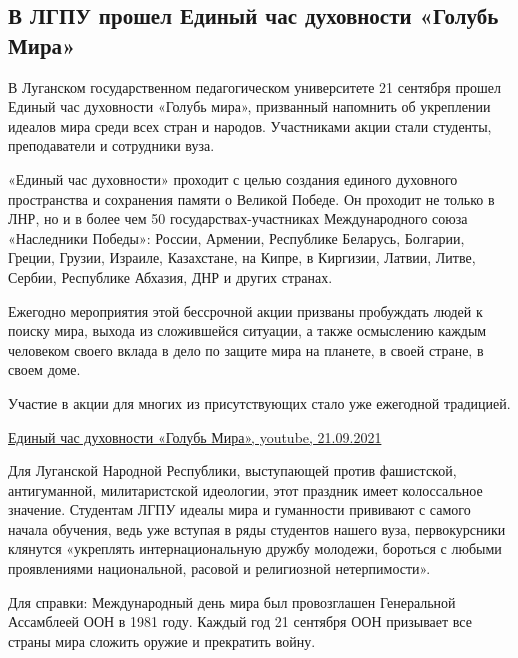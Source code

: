  
 
 
 
 
\subsection{В ЛГПУ прошел Единый час духовности «Голубь Мира»}
\label{sec:21_09_2021.stz.edu.lnr.lgpu.1.golub_mira}


В Луганском государственном педагогическом университете 21 сентября прошел
Единый час духовности «Голубь мира», призванный напомнить об укреплении идеалов
мира среди всех стран и народов. Участниками акции стали студенты,
преподаватели и сотрудники вуза. 


«Единый час духовности» проходит с целью создания единого духовного
пространства и сохранения памяти о Великой Победе. Он проходит не только в ЛНР,
но и в более чем 50 государствах-участниках Международного союза «Наследники
Победы»: России, Армении, Республике Беларусь, Болгарии, Греции, Грузии,
Израиле, Казахстане, на Кипре, в Киргизии, Латвии, Литве, Сербии, Республике
Абхазия, ДНР и других странах.


Ежегодно мероприятия этой бессрочной акции призваны пробуждать людей к поиску
мира, выхода из сложившейся ситуации, а также осмыслению каждым человеком
своего вклада в дело по защите мира на планете, в своей стране, в своем доме.

Участие в акции для многих из присутствующих стало уже ежегодной традицией.

\href{https://www.youtube.com/watch?v=hrBD5VRV5AY}{%
Единый час духовности «Голубь Мира», youtube, 21.09.2021%
}


Для Луганской Народной Республики, выступающей против фашистской, антигуманной,
милитаристской идеологии, этот праздник имеет колоссальное значение. Студентам
ЛГПУ идеалы мира и гуманности прививают с самого начала обучения, ведь уже
вступая в ряды студентов нашего вуза, первокурсники клянутся «укреплять
интернациональную дружбу молодежи, бороться с любыми проявлениями национальной,
расовой и религиозной нетерпимости».

Для справки: Международный день мира был провозглашен Генеральной Ассамблеей
ООН в 1981 году. Каждый год 21 сентября ООН призывает все страны мира сложить
оружие и прекратить войну.
